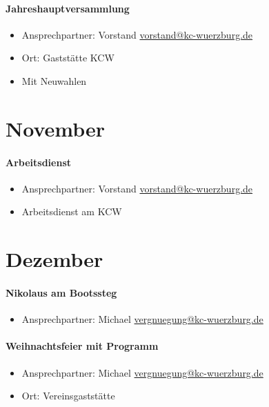 \documentclass[12pt, a4paper]{report}
\begin{document}
\paragraph{Jahreshauptversammlung}
\begin{itemize}
    \item Ansprechpartner: Vorstand \href{mailto:vorstand@kc-wuerzburg.de}{vorstand@kc-wuerzburg.de}
    \item Ort: Gaststätte KCW
    \item Mit Neuwahlen
\end{itemize}

\section*{November}\paragraph{Arbeitsdienst}
\begin{itemize}
    \item Ansprechpartner: Vorstand \href{mailto:vorstand@kc-wuerzburg.de}{vorstand@kc-wuerzburg.de}
    \item Arbeitsdienst am KCW
\end{itemize}

\section*{Dezember}\paragraph{Nikolaus am Bootssteg}
\begin{itemize}
    \item Ansprechpartner: Michael \href{mailto:vergnuegung@kc-wuerzburg.de}{vergnuegung@kc-wuerzburg.de}
\end{itemize}

\paragraph{Weihnachtsfeier mit Programm}
\begin{itemize}
    \item Ansprechpartner: Michael \href{mailto:vergnuegung@kc-wuerzburg.de}{vergnuegung@kc-wuerzburg.de}
    \item Ort: Vereinsgaststätte
\end{itemize}
\end{document}
